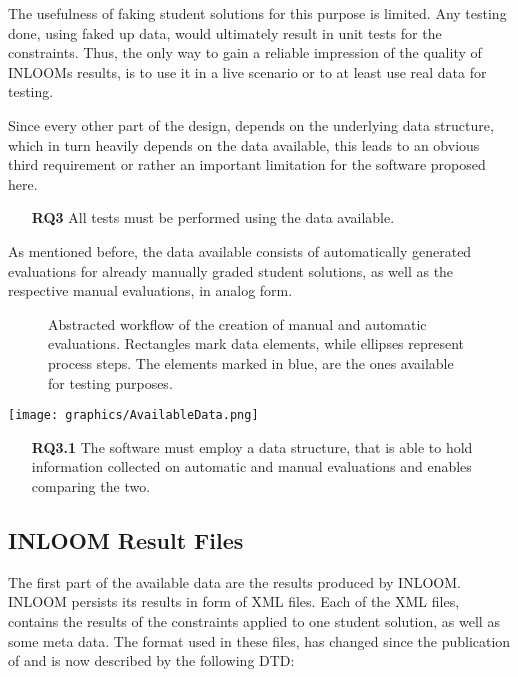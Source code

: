 The usefulness of faking student solutions for this purpose is limited. Any testing done,
using faked up data, would ultimately result in unit tests for the constraints. Thus, the 
only way to gain a reliable impression of the quality of INLOOMs results, is to use it
in a live scenario or to at least use real data for testing.

Since every other part of the design, depends on the underlying data structure, which in turn 
heavily depends on the data available, this leads to an obvious third requirement or rather an
important limitation for the software proposed here.

\begin{itemize}
    \item[\textbf{RQ3}] All tests must be performed using the data available.
\end{itemize}

As mentioned before, the data available consists of automatically generated evaluations
for already manually graded student solutions, as well as the respective manual evaluations,
in analog form. 

\begin{figure}
    \caption{Abstracted workflow of the creation of manual and automatic evaluations. Rectangles mark
        data elements, while ellipses represent process steps. The elements marked in blue, are 
        the ones available for testing purposes.
    }
    
\end{figure}
\texttt{[image: graphics/AvailableData.png]}

\begin{itemize}
    \item[\textbf{RQ3.1}] The software must employ a data structure, that is able to hold
    information collected on automatic and manual evaluations and enables comparing the two.
\end{itemize}

\subsection{INLOOM Result Files}
The first part of the available data are the results produced by INLOOM. INLOOM persists its 
results in form of XML files. Each of the XML files, contains the results of the constraints 
applied to one student solution, as well as some meta data. The format used in these files,
has changed since the publication of \cite{1} and is now described by the following DTD:

